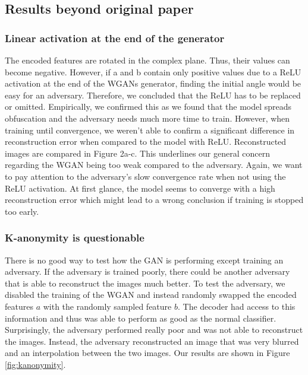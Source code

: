 \subsection{Results beyond original paper}

\subsubsection{Linear activation at the end of the generator}
The encoded features are rotated in the complex plane. Thus, their values can become negative. However, if a and b contain only positive values due to a ReLU activation at the end of the WGANs generator, finding the initial angle would be easy for an adversary. Therefore, we concluded that the ReLU has to be replaced or omitted. Empirically, we confirmed this as we found that the model spreads obfuscation and the adversary needs much more time to train. However, when training until convergence, we weren't able to confirm a significant difference in reconstruction error when compared to the model with ReLU. Reconstructed images are compared in Figure 2a-c. This underlines our general concern regarding the WGAN being too weak compared to the adversary. Again, we want to pay attention to the adversary's slow convergence rate when not using the ReLU activation. At first glance, the model seems to converge with a high reconstruction error which might lead to a wrong conclusion if training is stopped too early.

\subsubsection{K-anonymity is questionable}
There is no good way to test how the GAN is performing except training an adversary. If the adversary is trained poorly, there could be another adversary that is able to reconstruct the images much better.
To test the adversary, we disabled the training of the WGAN and instead randomly swapped the encoded features $a$ with the randomly sampled feature $b$. The decoder had access to this information and thus was able to perform as good as the normal classifier. Surprisingly, the adversary performed really poor and was not able to reconstruct the images. Instead, the adversary reconstructed an image that was very blurred and an interpolation between the two images. Our results are shown in Figure \ref{fig:kanonymity}.

